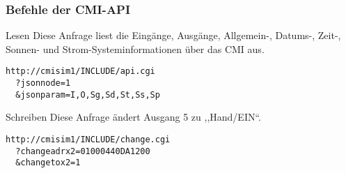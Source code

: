 \documentclass{beamer}
\begin{document}
\begin{frame}
    \frametitle{Befehle der CMI-API}
    \begin{exampleblock}{Lesen}
        Diese Anfrage liest die Eingänge, Ausgänge, Allgemein-, Datums-, Zeit-, Sonnen- und Strom-Systeminformationen über das CMI aus.
        \begin{alltt}
            http://cmisim1/INCLUDE/api.cgi\\
            ~~?jsonnode=1\\
            ~~\&jsonparam=\alert{I,O,Sg,Sd,St,Ss,Sp}
        \end{alltt}
    \end{exampleblock}

    \begin{exampleblock}{Schreiben}
        Diese Anfrage ändert Ausgang 5 zu ,,Hand/EIN``.
        \begin{alltt}
            http://cmisim1/INCLUDE/change.cgi\\
            ~~?changeadrx2=\alert{01000440DA1200}\\
            ~~\&changetox2=\alert{1}
        \end{alltt}
    \end{exampleblock}
\end{frame}
\end{document}
